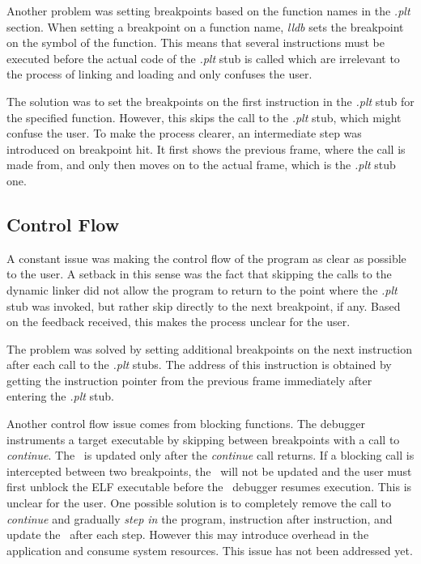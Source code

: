 Another problem was setting breakpoints based on the function names in the \textit{.plt} section. When setting a breakpoint on a function name, \textit{lldb} sets the breakpoint on the symbol of the function. This means that several instructions must be executed before the actual code of the \textit{.plt} stub is called which are irrelevant to the process of linking and loading and only confuses the user.

The solution was to set the breakpoints on the first instruction in the \textit{.plt} stub for the specified function. However, this skips the call to the \textit{.plt} stub, which might confuse the user. To make the process clearer, an intermediate step was introduced on breakpoint hit. It first shows the previous frame, where the call is made from, and only then moves on to the actual frame, which is the \textit{.plt} stub one.

\subsection{Control Flow}
\label{sub-sec:crontrol-flow-prob}

A constant issue was making the control flow of the program as clear as possible to the user. A setback in this sense was the fact that skipping the calls to the dynamic linker did not allow the program to return to the point where the \textit{.plt} stub was invoked, but rather skip directly to the next breakpoint, if any. Based on the feedback received, this makes the process unclear for the user.

The problem was solved by setting additional breakpoints on the next instruction after each call to the \textit{.plt} stubs. The address of this instruction is obtained by getting the instruction pointer from the previous frame immediately after entering the \textit{.plt} stub.

Another control flow issue comes from blocking functions. The debugger instruments a target executable by skipping between breakpoints with a call to \textit{continue}. The \gui\ is updated only after the \textit{continue} call returns. If a blocking call is intercepted between two breakpoints, the \gui\ will not be updated and the user must first unblock the ELF executable before the \project\ debugger resumes execution. This is unclear for the user. One possible solution is to completely remove the call to \textit{continue} and gradually \textit{step in} the program, instruction after instruction, and update the \gui\ after each step. However this may introduce overhead in the application and consume system resources. This issue has not been addressed yet.

